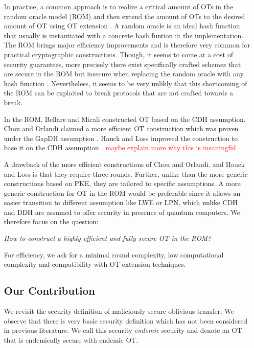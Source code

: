 In practice, a common approach is to realize a critical amount of OTs in the random oracle model (ROM) \cite{CCS:BelRog93} and then extend the amount of OTs to the desired amount of OT using OT extension \cite{STOC:Beaver96a,C:IKNP03,RSA:OrrOrsSch17}. A random oracle is an ideal hash function that usually is instantiated with a concrete hash funtion in the implementation. The ROM brings major efficiency improvements and is therefore very common for practical cryptographic constructions. Though, it seems to come at a cost of security guarantees, more precisely there exist specifically crafted schemes that are secure in the ROM but insecure when replacing the random oracle with any hash function \cite{STOC:CanGolHal98}. Nevertheless, it seems to be very unlikly that this shortcoming of the ROM can be exploited to break protocols that are not crafted towards a break. 

In the ROM, Bellare and Micali \cite{C:BelMic89} constructed OT based on the CDH assumption. Chou and Orlandi \cite{LC:ChoOrl15} claimed a more efficient OT construction which was proven under the GapDH assumption \cite{cryptoeprint:2017:1011}. Hauck and Loss improved the construction to base it on the CDH assumption \cite{cryptoeprint:2017:1011}. \textcolor{red}{maybe explain more why this is meaningful}

A drawback of the more efficient constructions of Chou and Orlandi, and Hauck and Loss is that they require three rounds. Further, unlike than the more generic constructions based on PKE, they are tailored to specific assumptions. A more generic construction for OT in the ROM would be preferable since it allows an easier transition to different assumption like LWE or LPN, which unlike CDH and DDH are assumed to offer security in presence of quantum computers. We therefore focus on the question:

\begin{center}
\emph{How to construct a highly efficient and fully secure OT in the ROM?}
\end{center}

For efficiency, we ask for a minimal round complexity, low computational complexity and compatibility with OT extension techniques.

\subsection{Our Contribution}

We revisit the security definition of maliciously secure oblivious transfer. We observe that there is very basic security definition which has not been considered in previous literature. We call this security \emph{endemic} security and denote an OT that is endemically secure with endemic OT. 

